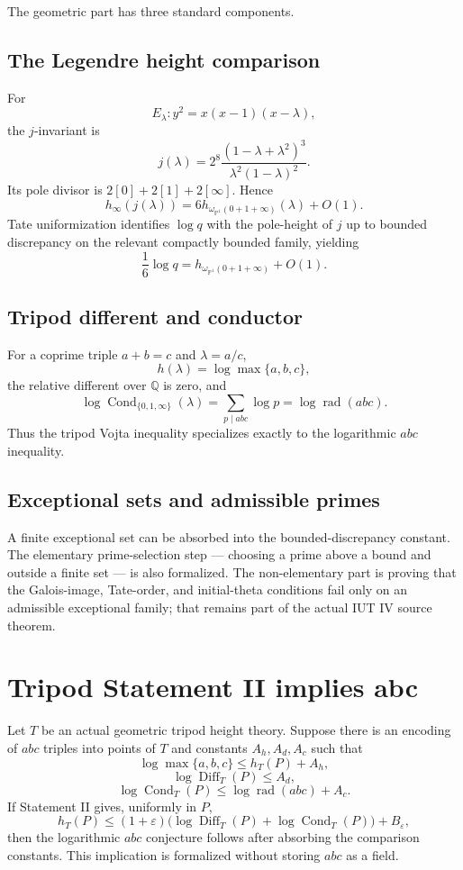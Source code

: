 \documentclass[11pt]{amsart}
\theoremstyle{definition}
\theoremstyle{remark}
\newcommand{\Q}{\mathbb Q}
\newcommand{\PP}{\mathbb P}
\newcommand{\rad}{\operatorname{rad}}
\newcommand{\eps}{\varepsilon}
\begin{document}
The geometric part has three standard components.

\subsection{The Legendre height comparison}
For
\[
 E_\lambda:y^2=x(x-1)(x-\lambda),
\]
the $j$-invariant is
\[
 j(\lambda)=2^8\frac{(1-\lambda+\lambda^2)^3}
 {\lambda^2(1-\lambda)^2}.
\]
Its pole divisor is $2[0]+2[1]+2[\infty]$.  Hence
\[
 h_\infty(j(\lambda))
 =6h_{\omega_{\PP^1}(0+1+\infty)}(\lambda)+O(1).
\]
Tate uniformization identifies $\log q$ with the pole-height of $j$ up to
bounded discrepancy on the relevant compactly bounded family, yielding
\[
 \frac16\log q
 =h_{\omega_{\PP^1}(0+1+\infty)}+O(1).
\]

\subsection{Tripod different and conductor}
For a coprime triple $a+b=c$ and $\lambda=a/c$,
\[
 h(\lambda)=\log\max\{a,b,c\},
\]
the relative different over $\Q$ is zero, and
\[
 \log\operatorname{Cond}_{\{0,1,\infty\}}(\lambda)
 =\sum_{p\mid abc}\log p
 =\log\rad(abc).
\]
Thus the tripod Vojta inequality specializes exactly to the logarithmic
$abc$ inequality.

\subsection{Exceptional sets and admissible primes}
A finite exceptional set can be absorbed into the bounded-discrepancy
constant.  The elementary prime-selection step --- choosing a prime above a
bound and outside a finite set --- is also formalized.  The non-elementary
part is proving that the Galois-image, Tate-order, and initial-theta
conditions fail only on an admissible exceptional family; that remains part
of the actual IUT IV source theorem.

\section{Tripod Statement II implies abc}

Let $T$ be an actual geometric tripod height theory.  Suppose there is an
encoding of $abc$ triples into points of $T$ and constants $A_h,A_d,A_c$ such
that
\[
 \log\max\{a,b,c\}
 \le h_T(P)+A_h,
\]
\[
 \log\operatorname{Diff}_T(P)\le A_d,
\]
\[
 \log\operatorname{Cond}_T(P)
 \le\log\rad(abc)+A_c.
\]
If Statement II gives, uniformly in $P$,
\[
 h_T(P)
 \le
 (1+\eps)
 \bigl(\log\operatorname{Diff}_T(P)+
       \log\operatorname{Cond}_T(P)\bigr)+B_\eps,
\]
then the logarithmic $abc$ conjecture follows after absorbing the comparison
constants.  This implication is formalized without storing $abc$ as a field.
\end{document}
